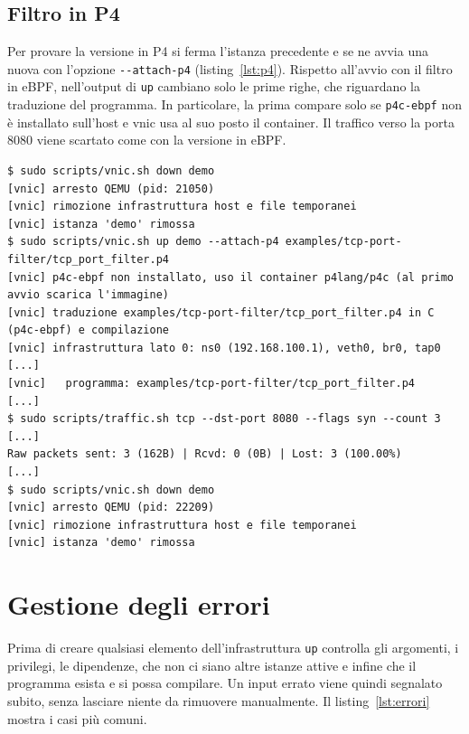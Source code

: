 \subsection{Filtro in P4}

Per provare la versione in P4 si ferma l'istanza precedente e se ne avvia una nuova con l'opzione \texttt{-{}-attach-p4} (listing~\ref{lst:p4}). Rispetto all'avvio con il filtro in eBPF, nell'output di \texttt{up} cambiano solo le prime righe, che riguardano la traduzione del programma. In particolare, la prima compare solo se \texttt{p4c-ebpf} non è installato sull'host e vnic usa al suo posto il container. Il traffico verso la porta 8080 viene scartato come con la versione in eBPF.

\noindent\begin{minipage}{\linewidth}
\begin{lstlisting}[style=terminale, caption={Avvio di vnic con il filtro in P4 e traffico verso la porta 8080}, label={lst:p4}]
$ sudo scripts/vnic.sh down demo
[vnic] arresto QEMU (pid: 21050)
[vnic] rimozione infrastruttura host e file temporanei
[vnic] istanza 'demo' rimossa
$ sudo scripts/vnic.sh up demo --attach-p4 examples/tcp-port-filter/tcp_port_filter.p4
[vnic] p4c-ebpf non installato, uso il container p4lang/p4c (al primo avvio scarica l'immagine)
[vnic] traduzione examples/tcp-port-filter/tcp_port_filter.p4 in C (p4c-ebpf) e compilazione
[vnic] infrastruttura lato 0: ns0 (192.168.100.1), veth0, br0, tap0
[...]
[vnic]   programma: examples/tcp-port-filter/tcp_port_filter.p4
[...]
$ sudo scripts/traffic.sh tcp --dst-port 8080 --flags syn --count 3
[...]
Raw packets sent: 3 (162B) | Rcvd: 0 (0B) | Lost: 3 (100.00%)
[...]
$ sudo scripts/vnic.sh down demo
[vnic] arresto QEMU (pid: 22209)
[vnic] rimozione infrastruttura host e file temporanei
[vnic] istanza 'demo' rimossa
\end{lstlisting}
\end{minipage}

\section{Gestione degli errori}\label{sec:errori}

Prima di creare qualsiasi elemento dell'infrastruttura \texttt{up} controlla gli argomenti, i privilegi, le dipendenze, che non ci siano altre istanze attive e infine che il programma esista e si possa compilare. Un input errato viene quindi segnalato subito, senza lasciare niente da rimuovere manualmente. Il listing~\ref{lst:errori} mostra i casi più comuni.

